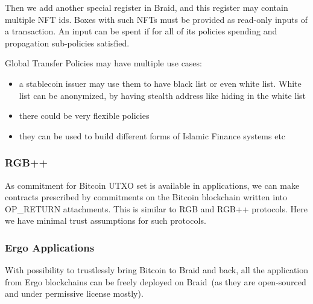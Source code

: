 \documentclass{llncs}   %
\newcommand{\bc}{Braid}
\begin{document}
Then we add another special register in Braid, and this register may contain multiple NFT ids. Boxes with such NFTs must be provided as read-only inputs of a transaction. An input can be spent if for all of its policies spending and propagation sub-policies satisfied.



Global Transfer Policies may have multiple use cases:

\begin{itemize}
\item a stablecoin issuer may use them to have black list or even white list. White list can be anonymized, by having stealth address like hiding in the white list
\item there could be very flexible policies  
\item they can be used to build different forms of Islamic Finance systems etc
\end{itemize}

\subsubsection{RGB++}

As commitment for Bitcoin UTXO set is available in applications, we can make contracts prescribed by commitments on the Bitcoin blockchain  written into OP\_RETURN attachments. This is similar to RGB and RGB++ protocols. Here we have minimal trust assumptions for such protocols.

\subsubsection{Ergo Applications}

With possibility to trustlessly bring Bitcoin to \bc{} and back, all the application from Ergo blockchains can be freely deployed on \bc{}~(as they are open-sourced and under permissive license mostly).


\newpage

 
\end{document}
